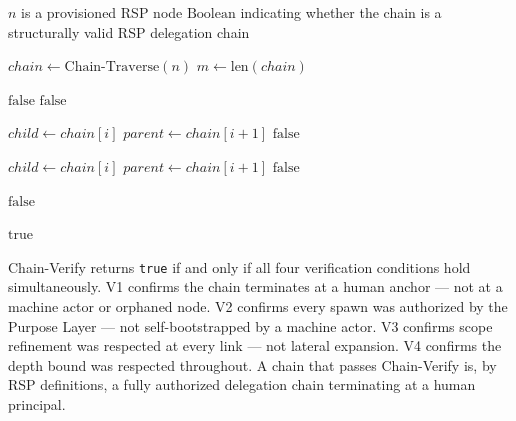 \begin{algorithm}
\caption{Chain-Verify($n$) — Verify that node $n$ terminates at a human anchor via a valid RSP chain}
\label{alg:chain-verify}
\begin{algorithmic}[1]
\REQUIRE $n$ is a provisioned RSP node
\ENSURE $\text{Boolean}$ indicating whether the chain is a structurally valid RSP delegation chain

\STATE $chain \leftarrow \text{Chain-Traverse}(n)$
\STATE $m \leftarrow \text{len}(chain)$

\STATE {}
    \STATE \RETURN $\text{false}$ 
\ENDIF
{}
    \STATE \RETURN $\text{false}$ 
\ENDIF

\STATE {}
    \STATE $child \leftarrow chain[i]$
    \STATE $parent \leftarrow chain[i+1]$
        \STATE \RETURN $\text{false}$ 
    \ENDIF
\ENDFOR

\STATE {}
    \STATE $child \leftarrow chain[i]$
    \STATE $parent \leftarrow chain[i+1]$
        \STATE \RETURN $\text{false}$ 
    \ENDIF
\ENDFOR

\STATE {}
        \STATE \RETURN $\text{false}$ 
    \ENDIF
\ENDFOR

\RETURN $\text{true}$
\end{algorithmic}
\end{algorithm}

Chain-Verify returns \texttt{true} if and only if all four verification conditions hold simultaneously. V1 confirms the chain terminates at a human anchor — not at a machine actor or orphaned node. V2 confirms every spawn was authorized by the Purpose Layer — not self-bootstrapped by a machine actor. V3 confirms scope refinement was respected at every link — not lateral expansion. V4 confirms the depth bound was respected throughout. A chain that passes Chain-Verify is, by RSP definitions, a fully authorized delegation chain terminating at a human principal.

